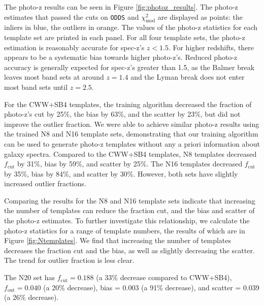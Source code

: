 The photo-z results can be seen in Figure \ref{fig:photoz_results}.
The photo-z estimates that passed the cuts on \texttt{ODDS} and $\chi_\text{mod}^2$ are displayed as points: the inliers in blue, the outliers in orange.
The values of the photo-z statistics for each template set are printed in each panel.
For all four template sets, the photo-z estimation is reasonably accurate for spec-z's $z < 1.5$.
For higher redshifts, there appears to be a systematic bias towards higher photo-z's.
Reduced photo-z accuracy is generally expected for spec-z's greater than 1.5, as the Balmer break leaves most band sets at around $z=1.4$ and the Lyman break does not enter most band sets until $z=2.5$.

For the CWW+SB4 templates, the training algorithm decreased the fraction of photo-z's cut by 25\%, the bias by 63\%, and the scatter by 23\%, but did not improve the outlier fraction.
We were able to achieve similar photo-z results using the trained N8 and N16 template sets, demonstrating that our training algorithm can be used to generate photo-z templates without any a priori information about galaxy spectra.
Compared to the CWW+SB4 templates, N8 templates decreased $f_\text{cut}$ by 31\%, bias by 59\%, and scatter by 25\%.
The N16 templates decreased $f_\text{cut}$ by 35\%, bias by 84\%, and scatter by 30\%.
However, both sets have slightly increased outlier fractions.

Comparing the results for the N8 and N16 template sets indicate that increasing the number of templates can reduce the fraction cut, and the bias and scatter of the photo-z estimates.
To further investigate this relationship, we calculate the photo-z statistics for a range of template numbers, the results of which are in Figure \ref{fig:Ntemplates}.
We find that increasing the number of templates decreases the fraction cut and the bias, as well as slightly decreasing the scatter.
The trend for outlier fraction is less clear.

The N20 set has $f_\text{cut} = 0.188$ (a 33\% decrease compared to CWW+SB4), $f_\text{out} = 0.040$ (a 20\% decrease), bias = 0.003 (a 91\% decrease), and scatter = 0.039 (a 26\% decrease).


